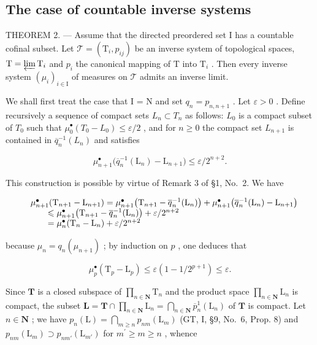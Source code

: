 \subsection{The case of countable inverse systems}

THEOREM 2. --- Assume that the directed preordered set I has a countable cofinal subset. Let \(\mathcal{T} = (\mathrm{T}_i, p_{ij})\) be an inverse system of topological spaces, \(\mathrm{T} = \varprojlim \mathrm{T}_i\) and \(p_i\) the canonical mapping of \(\mathrm{T}\) into \(\mathrm{T}_i\) . Then every inverse system \((\mu_i)_{i \in \mathrm{I}}\) of measures on \(\mathcal{T}\) admits an inverse limit.

We shall first treat the case that I = N and set \(q_{n} = p_{n,n+1}\) . Let \(\varepsilon > 0\) . Define recursively a sequence of compact sets \(L_{n} \subset T_{n}\) as follows: \(L_{0}\) is a compact subset of \(T_{0}\) such that \(\mu_{0}^{\bullet}(T_{0} - L_{0}) \leqslant \varepsilon / 2\) , and for \(n \geqslant 0\) the compact set \(L_{n+1}\) is contained in \(\overline{q}_{n}^{-1}(L_{n})\) and satisfies

\[
\mu_ {n + 1} ^ {\bullet} \big (\overline{q}_{n}^{-1} (\mathrm{L} _ {n}) - \mathrm{L} _ {n + 1} \big) \leqslant \varepsilon / 2 ^ {n + 2}.
\]

This construction is possible by virtue of Remark 3 of §1, No.~2. We have

\[
\begin{array}{r l} & {\mu_ {n + 1} ^ {\bullet} (\mathrm{T} _ {n + 1} - \mathrm{L} _ {n + 1}) = \mu_ {n + 1} ^ {\bullet} \big (\mathrm{T} _ {n + 1} - \overline{q}_{n}^{-1} (\mathrm{L} _ {n}) \big) + \mu_ {n + 1} ^ {\bullet} \big (\overline{q}_{n}^{-1} (\mathrm{L} _ {n}) - \mathrm{L} _ {n + 1} \big)} \\ & {\qquad \leqslant \mu_ {n + 1} ^ {\bullet} \big (\mathrm{T} _ {n + 1} - \overline{q}_{n}^{-1} (\mathrm{L} _ {n}) \big) + \varepsilon / 2 ^ {n + 2}} \\ & {\qquad = \mu_ {n} ^ {\bullet} (\mathrm{T} _ {n} - \mathrm{L} _ {n}) + \varepsilon / 2 ^ {n + 2}} \end{array}
\]

because \(\mu_{n} = q_{n}(\mu_{n + 1})\) ; by induction on \(p\) , one deduces that

\[
\mu_ {p} ^ {\bullet} \left(\mathrm{T} _ {p} - \mathrm{L} _ {p}\right) \leqslant \varepsilon \left(1 - 1 / 2 ^ {p + 1}\right) \leqslant \varepsilon .
\]

Since \(\mathbf{T}\) is a closed subspace of \(\prod_{n\in \mathbf{N}}\mathrm{T}_n\) and the product space \(\prod_{n\in \mathbf{N}}\mathrm{L}_n\) is compact, the subset \(\mathbf{L} = \mathbf{T}\cap \prod_{n\in \mathbf{N}}\mathrm{L}_n = \bigcap_{n\in \mathbf{N}}\overline{p}_n^1 (\mathrm{L}_n)\) of \(\mathbf{T}\) is compact. Let \(n\in \mathbf{N}\) ; we have \(p_n(\mathrm{L}) = \bigcap_{m\geqslant n}p_{nm}(\mathrm{L}_m)\) (GT, I, §9, No.~6, Prop. 8) and \(p_{nm}(\mathrm{L}_m)\supset p_{nm'}(\mathrm{L}_{m'})\) for \(m^{\prime}\geqslant m\geqslant n\) , whence

